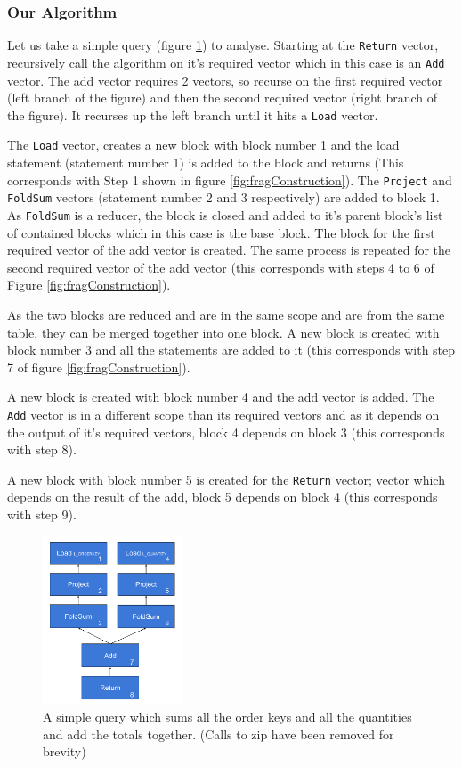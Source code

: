 \subsubsection{Our Algorithm}
Let us take a simple query (figure \ref{fig:simpleQuery}) to analyse. Starting at the \texttt{Return} vector, recursively call the algorithm on it's required vector which in this case is an \texttt{Add} vector. The add vector requires 2 vectors, so recurse on the first required vector (left branch of the figure) and then the second required vector (right branch of the figure). It recurses up the left branch until it hits a \texttt{Load} vector.

The \texttt{Load} vector, creates a new block with block number 1 and the load statement (statement number 1) is added to the block and returns (This corresponds with Step 1 shown in figure \ref{fig:fragConstruction}). The \texttt{Project} and \texttt{FoldSum} vectors (statement number 2 and 3 respectively) are added to block 1. As \texttt{FoldSum} is a reducer, the block is closed and added to it's parent block's list of contained blocks which in this case is the base block. The block for the first required vector of the add vector is created. The same process is repeated for the second required vector of the add vector (this corresponds with steps 4 to 6 of Figure \ref{fig:fragConstruction}). 

As the two blocks are reduced and are in the same scope and are from the same table, they can be merged together into one block. A new block is created with block number 3 and all the statements are added to it (this corresponds with step 7 of figure \ref{fig:fragConstruction}). 

A new block is created with block number 4 and the add vector is added. The \texttt{Add} vector is in a different scope than its required vectors and as it depends on the output of it's required vectors, block 4 depends on block 3 (this corresponds with step 8). 

A new block with block number 5 is created for the \texttt{Return} vector; vector which depends on the result of the add, block 5 depends on block 4 (this corresponds with step 9).

\begin{figure}[h]
\centering
\includegraphics[width=\textwidth,height=5cm,keepaspectratio]{design-and-implementation/SimpleQuery.pdf}
\caption{A simple query which sums all the order keys and all the quantities and add the totals together. (Calls to zip have been removed for brevity)}
\label{fig:simpleQuery}
\end{figure}

